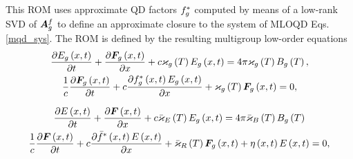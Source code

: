 	\iffalse
	A singular value relative cutoff criteria is defined $\varepsilon_\sigma < 1$ such that for each set of singular values per group, $(\sigma_{1,g},\dots,\sigma_{k,g})$, there will be a $r_g \leq k$ such that
	\begin{equation}
		\frac{\sigma_{n,g}}{\sigma_{1,g}} \geq \varepsilon_\sigma \label{cutoff_eps2}
	\end{equation}
	
	for all $n \leq r_g$. The reduced rank approximation of each group QD factor matrix is thus given as $\bA^{f*}_g  = \bU_g^*\bSig_g^*\bV_g^{*T} $ where $\bU_g^* \in \real^{\chi,r_g}$, $\bSig_g^* \in \real^{r_g,r_g}$, $\bV_g^{*T} \in \real^{r_g,\tau}$. The ratio of energy contained in the first $n$ POD modes to the total energy of all POD modes \cite{Benner-siam-2015} is
	\begin{equation}
		\gamma_n = \frac{\sum_{i=1}^{n} \sigma_i^2}{\sum_{i=1}^{k} \sigma_i^2}, \label{worth_gam2}
	\end{equation}
	This can also be interpreted as the ratio of modeled to total energy contained in the data snapshots \cite{gubisch-volkwein}.
	\fi
	
	\ind This ROM uses approximate QD factors $f_g^*$ computed by means of a low-rank SVD of $\bm{A}_g^f$ to define an approximate closure to the system of MLOQD Eqs. \eqref{mqd_sys}. The ROM is defined by the resulting multigroup low-order equations
	\begin{subequations}
		\begin{gather}
			\frac{\partial E_g\left( x,t\right)}{\partial t} + \frac{\partial \bm{F}_g\left( x,t\right)}{\partial x} + c\varkappa_{g}\left( T\right)E_g\left( x,t\right) = 4\pi\varkappa_{g}\left( T\right)B_{g}\left( T\right), \label{mlqd_pod_zero}\\
			\frac{1}{c}\frac{\partial \bm{F}_g\left( x,t\right)}{\partial t} + c\frac{\partial f_g^*\left( x,t\right)E_g\left( x,t\right)}{\partial x} + \varkappa_{g}\left( T\right)\bm{F}_g\left( x,t\right) = 0, \label{mlqd_pod_first}
		\end{gather}
			\label{mlqd_pod_eqs}
	\end{subequations}

	
	\iffalse
	\begin{subequations}
		\begin{gather}
			\frac{\partial E\left( x,t\right)}{\partial t} + \frac{\partial \bm{F}\left( x,t\right)}{\partial x} + c\bar{\varkappa}_{E}\left( T\right)E_g\left( x,t\right) = 4\pi\bar{\varkappa}_{B}\left( T\right)B_{g}\left( T\right) \label{mlqd_pod_zero_gr}\\
			\frac{1}{c}\frac{\partial \bm{F}\left( x,t\right)}{\partial t} + c\frac{\partial \bar{f}^*\left( x,t\right)E\left( x,t\right)}{\partial x} + \bar{\varkappa}_{R}\left( T\right)\bm{F}_g\left( x,t\right) + \eta\left( x,t\right)E\left( x,t\right) = 0, \label{mlqd_pod_first_gr}
		\end{gather}
			\label{mlqd_pod_gr_eqs}
	\end{subequations}

